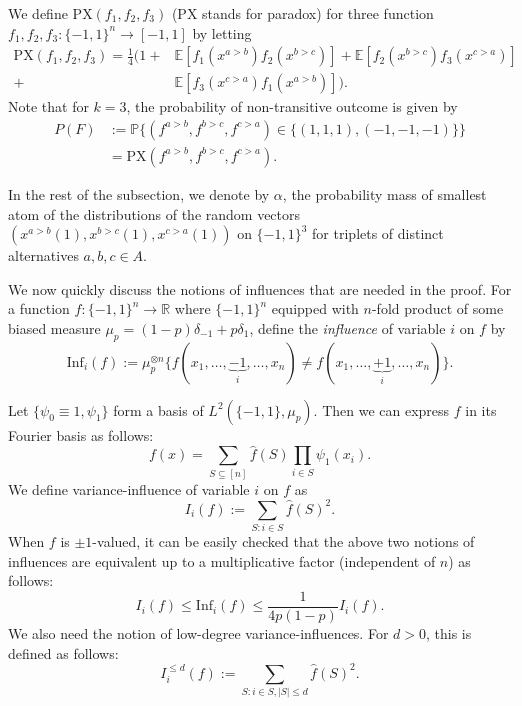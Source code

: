 \documentclass[11pt]{amsart}
\newcommand{\E}{\mathbb{E}}
\newcommand{\PP}{\mathbb{P}}
\newcommand{\1}{\mathbf{1}}
\newcommand{\Px}{\mathrm{PX}}
\newcommand{\I}{\mathrm{Inf}}
\def\E{{\mathbb E}}
\theoremstyle{definition}
\theoremstyle{plain}
\theoremstyle{remark}
\numberwithin{equation}{section}
\begin{document}
We {define} $\Px(f_1,f_2,f_3)$ ($\Px$ stands for paradox) for three function $f_1,f_2,f_3 : \{-1,1\}^n \to [-1,1]$ by letting
\begin{align*}
\Px(f_1,f_2,f_3)=
\frac{1}{4}\Big( 1 + &\E[f_1(x^{a>b})f_2(x^{b>c})] + \E[f_2(x^{b>c})f_3(x^{c>a})] \\
+ &\E[f_3(x^{c>a})f_1(x^{a>b})] \Big) .
\end{align*}
Note that for $k=3$, the probability of non-transitive outcome is given by
\begin{align*}
P(F) &:= \PP \big \{ (f^{a>b},f^{b>c},f^{c>a}) \in \{ (1,1,1), (-1,-1, -1) \} \big\}  \\
&= \Px(f^{a>b},f^{b>c},f^{c>a}).
\end{align*}


In the rest of the subsection, we denote by $\alpha$, the probability mass of smallest atom of the distributions of the random vectors  $(x^{a>b}(1), x^{b >c}(1), x^{c>a}(1))$  on $\{-1, 1\}^3$ for triplets of distinct alternatives $a, b, c\in A$.




We now quickly discuss the notions of influences that are needed in the proof.
For a function $f: \{-1, 1\}^n \to \mathbb R$ where $\{-1, 1\}^n$ equipped with $n$-fold product  of  some biased measure $\mu_p = (1-p) \delta_{-1} + p \delta_1$, define the {\em influence}
of variable $i$ on $f$ by
\[\I_i(f) :=  \mu_p^{\otimes n} \big\{ f(x_1, \ldots, \underbrace{-1}_{i}, \ldots, x_n)  \ne f(x_1, \ldots, \underbrace{+1}_{i}, \ldots, x_n) \big\}.\]

Let $\{ \psi_0 \equiv 1, \psi_1 \}$ form a basis of $L^2( \{-1,1\}, \mu_p )$. Then we can express $f$ in its Fourier basis as follows:
\[ f(x) = \sum_{ S \subseteq [n]} \hat f(S) \prod_{ i \in S} \psi_1(x_i).\] We define variance-influence of variable $i$ on $f$ as
\[ I_i(f)  :=  \sum_{S :  i \in S}  \hat f(S)^2. \]
When $f$ is $\pm 1$-valued, it can be easily checked that the above two notions of influences are equivalent up to a multiplicative factor (independent of $n$) as follows: \[ I_i(f) \le  \I_i(f) \le  \frac{1}{4 p(1-p)} I_i(f).\]
We also need the notion of low-degree variance-influences. For $d >0$,  this is defined as follows:
\[ I^{ \le d}_i(f) :=  \sum_{S :  i \in S, |S| \le d}  \hat f(S)^2.\]
\end{document}
